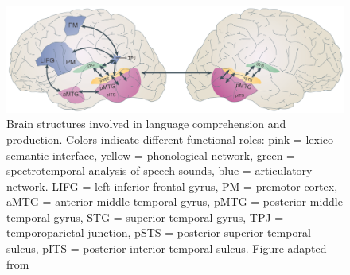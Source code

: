 \begin{figure}[!ht]
	\centering
	\includegraphics[width=.9\textwidth, clip=true]{./Chapters/01_Introduction/Images_MM/Language_network_all_labels}
	\caption{Brain structures involved in language comprehension and production. Colors indicate different functional roles: pink = lexico-semantic interface, yellow = phonological network, green = spectrotemporal analysis of speech sounds, blue = articulatory network. LIFG = left inferior frontal gyrus, PM = premotor cortex, aMTG = anterior middle temporal gyrus, pMTG = posterior middle temporal gyrus, STG = superior temporal gyrus, TPJ = temporoparietal junction, pSTS = posterior superior temporal sulcus, pITS = posterior interior temporal sulcus. Figure adapted from \citet{hickok2007}}
    \vspace*{-10pt}
	\label{fig:language}
\end{figure}